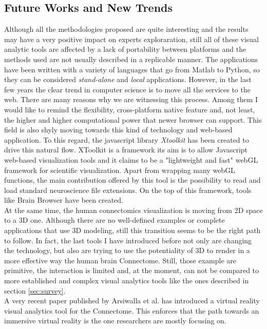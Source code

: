 \documentclass{article}
\begin{document}
\begin{multicols}{2}
\section{Future Works and New Trends}
\label{sec:futureWorks}
Although all the methodologies proposed are quite interesting and the results may have a very positive impact on experts exploraration, still all of these visual analytic tools are affected by a lack of portability between platforms and the methods used are not usually described in a replicable manner. The applications have been written with a variety of languages that go from Matlab to Python, so they can be considered \textit{stand-alone} and \textit{local} applications. However, in the last few years the clear trend in computer science is to move all the services to the web. There are many reasons why we are witnessing this process. Among them I would like to remind the flexibility, cross-platform native feature and, not least, the higher and higher computational power that newer browser can support. This field is also shyly moving towards this kind of technology and web-based application. To this regard, the javascript library \textit{Xtoolkit} \cite{xToolkit} has been created to drive this natural flow. XToolkit is a framework its aim is to allow Javascript web-based visualization tools and it claims to be a "lightweight and fast" webGL framework for scientific visualization. Apart from wrapping many webGL functions, the main contribution offered by this tool is the possibility to read and load standard neuroscience file extensions. On the top of this framework, tools like Brain Browser \cite{brainBrowser} have been created. \\

At the same time, the human connectomics visualization is moving from 2D space to a 3D one. Although there are no well-defined examples or complete applications that use 3D modeling, still this transition seems to be the right path to follow. In fact, the last tools I have introduced before not only are changing the technology, but also are trying to use the potentiality of 3D to render in a more effective way the human brain Connectome. Still, those example are primitive, the interaction is limited and, at the moment, can not be compared to more established and complex visual analytics tools like the ones described in section \ref{sec:survey}.\\
A very recent paper published by Arsiwalla et al. \cite{arsiwalla2015network} has introduced a virtual reality visual analytics tool for the Connectome. This enforces that the path towards an immersive virtual reality is the one researchers are mostly focusing on. 



\end{multicols}
\end{document}
